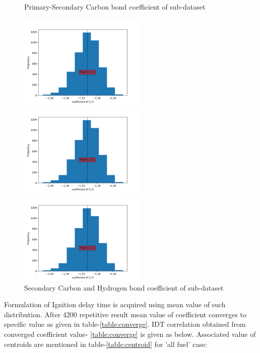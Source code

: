 \documentclass[preprint,12pt]{elsarticle}
\begin{document}
\begin{figure}	[H]
\begin{multicols}{3}
				    	\end{multicols}				 					 \caption{Primary-Secondary Carbon bond coefficient of sub-dataset}	  		  
				    	\begin{multicols}{3}
				    		\includegraphics[width=6cm]{SH2.png}\par
				    		\includegraphics[width=6cm]{SH2.png}\par
				    		\includegraphics[width=6cm]{SH2.png}\par
				    	\end{multicols}
				    	\caption{Secondary Carbon and Hydrogen bond coefficient of sub-dataset}	  		  				 
				    	\label{plot:histend}	
				    \end{figure}
				    
				    Formulation of Ignition delay time is acquired using mean value of such distribution. After 4200 repetitive result mean value of coefficient converges to specific value as given in table-\ref{table:converge}. IDT correlation obtained from converged coefficient value- \ref{table:converge} is given as below. Associated value of centroids are mentioned in table-\ref{table:centroid} for 'all fuel' case:
				    
\end{document}
